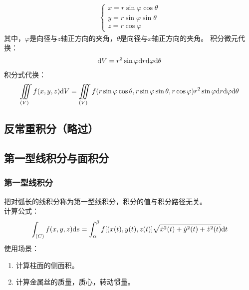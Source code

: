 \begin{enumerate}
\begin{align}
		\begin{cases}
			x=r \sin \varphi \cos \theta\\
			y=r \sin \varphi \sin \theta\\
			z=r \cos \varphi
		\end{cases}
	\end{align}
	其中，$\varphi$是向径与$z$轴正方向的夹角，$\theta$是向径与$x$轴正方向的夹角。
	积分微元代换：
	\begin{align}
		\mathrm{d} V = r^2 \sin \varphi \mathrm{d} r \mathrm{d} \varphi \mathrm{d} \theta
	\end{align}
	积分式代换：
	\begin{align}
		\iiint\limits_{(V)} f(x,y,z) \mathrm{d} V = \iiint\limits_{(V)} f(r \sin \varphi \cos \theta,r \sin \varphi \sin \theta,r \cos \varphi) r^2 \sin \varphi \mathrm{d} r \mathrm{d} \varphi \mathrm{d} \theta
	\end{align}
\end{enumerate}
\subsection{反常重积分（略过）}
\subsection{第一型线积分与面积分}
\subsubsection{第一型线积分}
把对弧长的线积分称为第一型线积分，积分的值与积分路径无关。\\
计算公式：
\begin{align}
	\int_{(C)} f(x,y,z) \mathrm{d} s = \int_{\alpha}^{\beta} f[(x(t),y(t),z(t)] \sqrt{\dot{x}^{2}(t)+\dot{y}^{2}(t)+\dot{z}^{2}(t)} \mathrm{d} t
\end{align}
使用场景：
\begin{enumerate}
	\item 计算柱面的侧面积。
	\item 计算金属丝的质量，质心，转动惯量。
\end{enumerate}
